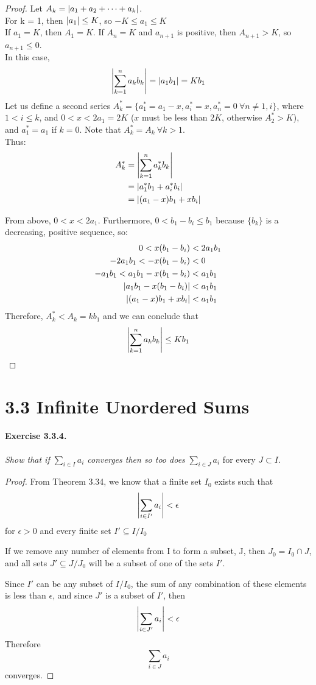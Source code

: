 \documentclass[11pt]{article}
\DeclarePairedDelimiter{\abs}{\lvert}{\rvert}
\newcommand{\set}[1]{\{#1\}}
\begin{document}
\begin{proof}
	Let $\Ak = \AkSeries$. \\
	For k =  1, then $\abs{a_1}  \leq K$, so $-K \leq a_1 \leq K$ \\
	If $a_1 = K$, then $A_1 = K$. If $A_n = K$ and $a_{n+1}$ is positive, then $A_{n+1} > K$, so $a_{n+1} \leq 0$. \\
	In this case, $$\absum = \abs{a_1b_1} = Kb_1$$
	Let us define a second series $A^*_k = \{a^*_1 = a_1 - x, a^*_i = x, a^*_n = 0\ \forall n\ne 1, i\}$, where $1 < i \leq k$, and $0 < x < 2a_1 = 2K$ ($x$ must be less than $2K$, otherwise $A^*_2 > K$), and $a^*_1 = a_1$ if $ k = 0$. Note that $A^*_k = A_k\ \forall k > 1$. \\
	Thus:
	\begin{align*}
		A^*_k & = \abstarsum \\
		&= \abs{a^*_1 b_1 + a^*_i b_i} \\
		&=\abs{(a_1 - x) b_1 + x b_i} \\
	\end{align*}
	
	From above, $0 < x < 2a_1$. Furthermore, $0 < b_1-b_i \leq b_1$ because $\set{b_k}$ is a decreasing, positive sequence, so:
	\begin{align*}
		0 < x (b_1 - b_i) &< 2 a_1 b_1 \\
		-2 a_1 b_1 < - x (b_1 - b_i) &< 0 \\
		-a_1 b_1 < a_1 b_1 - x (b_1 - b_i) &< a_1 b_1\\		
		\abs{a_1b_1 - x (b_1 - b_i)} &< a_1 b_1 \\
		\abs{(a_1 - x) b_1 + x b_i} &< a_1 b_1 \\
	\end{align*}
	Therefore, $A^*_k < A_k = kb_1$ and we can conclude that $$\absum \leq Kb_1$$
	
\end{proof}


\section*{3.3 Infinite Unordered Sums}
\paragraph{Exercise 3.3.4.} \textit{Show that if $\sum_{i\in I}a_i$ converges then so too does} $\sum_{i\in J}a_i$ for every $J \subset I$.

\begin{proof}
From Theorem 3.34, we know that a finite set $I_0$ exists such that $$\abs*{\sum_{i \in I'} a_i} < \epsilon$$ for $\epsilon > 0$ and every finite set $I' \subseteq I/I_0$

If we remove any number of elements from I to form a subset, J, then $J_0 = I_0 \cap J$, and all sets $J' \subseteq J/J_0$ will be a subset of one of the sets $I'$.

Since $I'$ can be any subset of $I/I_0$, the sum of any combination of these elements is less than $\epsilon$, and since $J'$ is a subset of $I'$, then $$\abs*{\sum_{i \in J'} a_i} < \epsilon$$
Therefore $$\sum_{i\in J}a_i$$ converges.
\end{proof}
\end{document}

